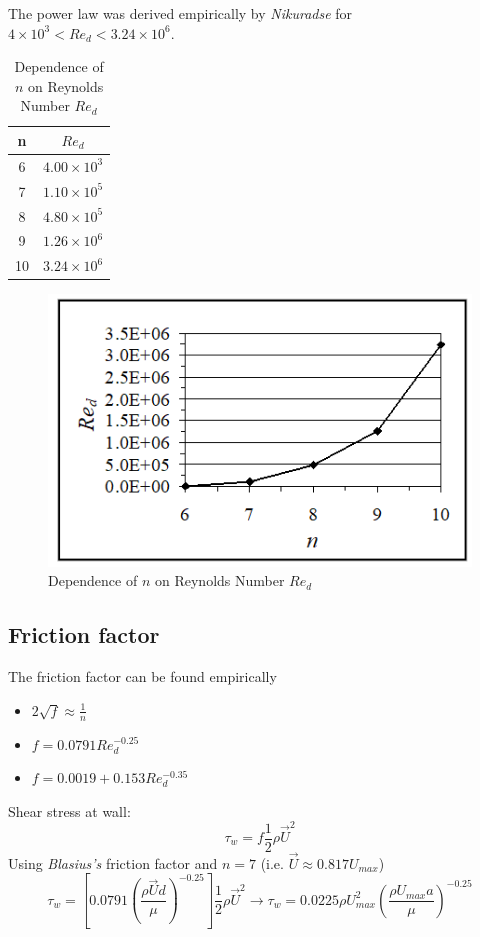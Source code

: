 \documentclass[class=report, crop=false, 12pt,a4paper]{standalone}
\begin{document}
The power law was derived empirically by \textit{Nikuradse} for $4\times10^3 < Re_d < 3.24 \times 10^6$.
\begin{table}[H]
  \begin{center}
  \begin{tabular}{|c|c|}
    \hline
    \textbf{n} & \textbf{$Re_d$}\\
    \hline
    \hline
    6 & $4.00 \times 10^3$\\
    \hline
    7 & $1.10 \times 10^5$\\
    \hline
    8 & $4.80 \times 10^5$\\
    \hline
    9 & $1.26 \times 10^6$\\
    \hline
    10 & $3.24 \times 10^6$\\
    \hline 
  \end{tabular}
  \end{center}
  \caption{Dependence of $n$ on Reynolds Number $Re_d$}
\end{table}
\begin{figure}[H]
  \centering
  \includegraphics[width = 0.7 \textwidth]{../img/diagram85.png}
  \caption{Dependence of $n$ on Reynolds Number $Re_d$}
\end{figure}
\subsection{Friction factor}
The friction factor can be found empirically
\begin{itemize}
  \item {} $2\sqrt{f} \approx \frac{1}{n}$
  \item {} $f = 0.0791 Re_d^{-0.25}$
  \item {} $f=0.0019 + 0.153Re_d^{-0.35}$
\end{itemize}
Shear stress at wall:
\begin{equation}
  \tau_w = f \frac{1}{2} \rho \vec{U}^2
\end{equation}
Using \textit{Blasius's} friction factor and $n=7$ (i.e. $\vec{U} \approx 0.817U_{max}$)
\begin{equation}
  \tau_w = \left[ 0.0791\left(\frac{\rho \vec{U}d}{\mu}\right)^{-0.25} \right] \frac{1}{2}\rho \vec{U}^2 \rightarrow \tau_w = 0.0225 \rho U^2_{max} \left(\frac{\rho U_{max}a}{\mu}\right)^{-0.25}
\end{equation}
\end{document}
